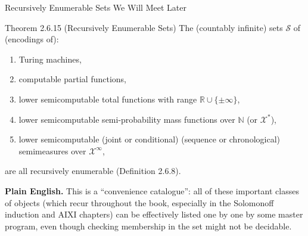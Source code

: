 \documentclass[aspectratio=169,10pt]{beamer}
\newcommand{\N}{\mathbb{N}}
\newcommand{\R}{\mathbb{R}}
\begin{document}
\begin{frame}[allowframebreaks]{Recursively Enumerable Sets We Will Meet Later}
  \begin{block}{Theorem 2.6.15 (Recursively Enumerable Sets)}
    The (countably infinite) sets $\mathcal{S}$ of (encodings of):
    \begin{enumerate}
      \item[(i)] Turing machines,
      \item[(ii)] computable partial functions,
      \item[(iii)] lower semicomputable total functions with range
        $\R \cup \{\pm\infty\}$,
      \item[(iv)] lower semicomputable semi-probability mass functions over
        $\N$ (or $\mathcal{X}^{*}$),
      \item[(v)] lower semicomputable (joint or conditional) (sequence or
        chronological) semimeasures over $\mathcal{X}^{\infty}$,
    \end{enumerate}
    are all recursively enumerable (Definition 2.6.8).
  \end{block}
  \textbf{Plain English.} This is a ``convenience catalogue'': all of these
  important classes of objects (which recur throughout the book, especially
  in the Solomonoff induction and AIXI chapters) can be effectively listed
  one by one by some master program, even though checking membership in the
  set might not be decidable.


\end{frame}
\end{document}
